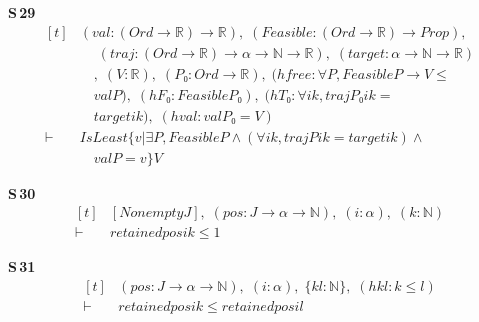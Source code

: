\noindent\textbf{S\,29}\quad{}
{\footnotesize\[ \begin{aligned}[t]
&(\mathit{val} : (\mathit{Ord} \to \mathbb{R} ) \to \mathbb{R} ),\; (\mathit{Feasible} : (\mathit{Ord} \to \mathbb{R} ) \to \mathit{Prop}),\\
&\quad \; (\mathit{traj} : (\mathit{Ord} \to \mathbb{R} ) \to \alpha \to \mathbb{N} \to \mathbb{R} ),\; (\mathit{target} : \alpha \to \mathbb{N} \to \mathbb{R} )\\
&\quad ,\; (\mathit{V} : \mathbb{R} ),\; (\mathit{P₀} : \mathit{Ord} \to \mathbb{R} ),\; (\mathit{hfree} : \forall \mathit{P}, \mathit{Feasible} \mathit{P} \to \mathit{V} \leq\\
&\quad \mathit{val} \mathit{P}),\; (\mathit{hF₀} : \mathit{Feasible} \mathit{P₀}),\; (\mathit{hT₀} : \forall \mathit{i} \mathit{k}, \mathit{traj} \mathit{P₀} \mathit{i} \mathit{k} =\\
&\quad \mathit{target} \mathit{i} \mathit{k}),\; (\mathit{hval} : \mathit{val} \mathit{P₀} = \mathit{V})\\
\vdash\;&\mathit{IsLeast} \{ \mathit{v} | \exists \mathit{P}, \mathit{Feasible} \mathit{P} \wedge (\forall \mathit{i} \mathit{k}, \mathit{traj} \mathit{P} \mathit{i} \mathit{k} = \mathit{target} \mathit{i} \mathit{k}) \wedge\\
&\quad \mathit{val} \mathit{P} = \mathit{v}\} \mathit{V}
\end{aligned} \]}

\noindent\textbf{S\,30}\quad{}
{\footnotesize\[ \begin{aligned}[t]
&[\mathit{Nonempty} \mathit{J}],\; (\mathit{pos} : \mathit{J} \to \alpha \to \mathbb{N} ),\; (\mathit{i} : \alpha ),\; (\mathit{k} : \mathbb{N} )\\
\vdash\;&\mathit{retained} \mathit{pos} \mathit{i} \mathit{k} \leq 1
\end{aligned} \]}

\noindent\textbf{S\,31}\quad{}
{\footnotesize\[ \begin{aligned}[t]
&(\mathit{pos} : \mathit{J} \to \alpha \to \mathbb{N} ),\; (\mathit{i} : \alpha ),\; \{ \mathit{k} \mathit{l} : \mathbb{N} \},\; (\mathit{hkl} : \mathit{k} \leq \mathit{l})\\
\vdash\;&\mathit{retained} \mathit{pos} \mathit{i} \mathit{k} \leq \mathit{retained} \mathit{pos} \mathit{i} \mathit{l}
\end{aligned} \]}

